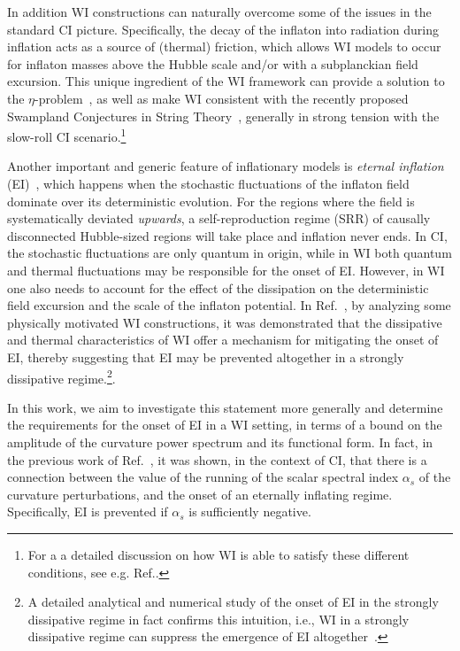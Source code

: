 \documentclass[a4paper,11pt]{article}
\begin{document}
In addition WI constructions can naturally overcome some of the issues in the standard CI picture. Specifically, the decay of the inflaton into radiation during inflation acts as a source of (thermal) friction, which allows 
WI models to occur for inflaton masses above the Hubble scale and/or with a subplanckian field excursion. This unique ingredient of the WI framework can provide a solution to the
$\eta$-problem~\cite{Bastero-Gil:2019gao}, as well as make WI
consistent with the recently proposed Swampland Conjectures in String
Theory~\cite{Das:2018hqy,Motaharfar:2018zyb,Das:2018rpg,Das:2019hto,Kamali:2019xnt,Brandenberger:2020oav,Das:2020xmh}, generally in strong
tension with the slow-roll CI scenario.\footnote{For a a detailed discussion on how WI is able to satisfy these different conditions, see e.g. Ref.\cite{Berera:2023liv}. }

Another important and generic feature of inflationary models is \textit{eternal inflation}
(EI)~\cite{Vilenkin:1983xq,Guth:1985ya,Linde:1986fc,Linde:1986fd,Starobinsky:1986fx},
which happens when the stochastic fluctuations of the inflaton field
dominate over its deterministic evolution. {}For the regions where the
field is systematically deviated {\it upwards},   a self-reproduction
regime (SRR) of causally disconnected Hubble-sized regions will take
place and inflation never ends. In CI, the stochastic fluctuations are
only quantum in origin, while in WI both quantum and thermal
fluctuations may be responsible for the onset of EI. However, in WI
one also needs to account for the effect of the dissipation on the
deterministic field excursion and the scale of the inflaton
potential. In Ref.~\cite{Vicente:2015hga}, by analyzing some physically motivated WI constructions, it was demonstrated  that the dissipative and thermal characteristics of WI offer a mechanism for mitigating the onset of EI,
thereby suggesting that EI may be prevented altogether in a strongly dissipative regime.\footnote{A detailed analytical and numerical study of the onset of EI in the strongly dissipative regime in fact confirms this intuition, i.e., WI in a strongly dissipative regime can suppress the emergence of EI altogether~\cite{MRVFeistudy}.}.

In this work, we aim to investigate this statement more generally and determine the requirements for the onset of EI in a WI setting, in terms of a bound on the amplitude of the curvature power spectrum and its functional form. In fact, in the previous work of Ref.~\cite{Kinney:2014jya}, it was shown, in
the context of CI, that there is a connection between the value of the
running of the scalar spectral index $\alpha_s$ of the curvature
perturbations, and the onset of an eternally inflating regime.  Specifically, EI is prevented if
$\alpha_s$ is sufficiently negative. 
\end{document}
